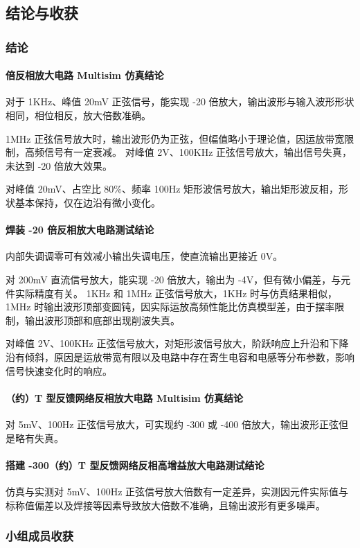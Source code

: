\documentclass[./测控三级项目.tex]{subfiles} %
\begin{document}
	\subsection{结论与收获}
		\subsubsection{结论}
			\paragraph{ 倍反相放大电路 Multisim 仿真结论}
			对于 1KHz、峰值 20mV 正弦信号，能实现 -20 倍放大，输出波形与输入波形形状相同，相位相反，放大倍数准确。\par
			1MHz 正弦信号放大时，输出波形仍为正弦，但幅值略小于理论值，因运放带宽限制，高频信号有一定衰减。
			对峰值 2V、100KHz 正弦信号放大，输出信号失真，未达到 -20 倍放大效果。\par
			对峰值 20mV、占空比 80\%、频率 100Hz 矩形波信号放大，输出矩形波反相，形状基本保持，仅在边沿有微小变化。
			\paragraph{\qquad 焊装 -20 倍反相放大电路测试结论}
			内部失调调零可有效减小输出失调电压，使直流输出更接近 0V。\par
			对 200mV 直流信号放大，能实现 -20 倍放大，输出为 -4V，但有微小偏差，与元件实际精度有关。
			1KHz 和 1MHz 正弦信号放大，1KHz 时与仿真结果相似，1MHz 时输出波形顶部变圆钝，因实际运放高频性能比仿真模型差，由于摆率限制，输出波形顶部和底部出现削波失真。\par
			对峰值 2V、100KHz 正弦信号放大，对矩形波信号放大，阶跃响应上升沿和下降沿有倾斜，原因是运放带宽有限以及电路中存在寄生电容和电感等分布参数，影响信号快速变化时的响应。
			\paragraph{（约）T 型反馈网络反相放大电路 Multisim 仿真结论}
			对 5mV、100Hz 正弦信号放大，可实现约 -300 或 -400 倍放大，输出波形正弦但是略有失真。
			\paragraph{\qquad 搭建 -300（约）T 型反馈网络反相高增益放大电路测试结论}
			仿真与实测对 5mV、100Hz 正弦信号放大倍数有一定差异，实测因元件实际值与标称值偏差以及焊接等因素导致放大倍数不准确，且输出波形有更多噪声。
		\subsubsection{小组成员收获}
\end{document}
